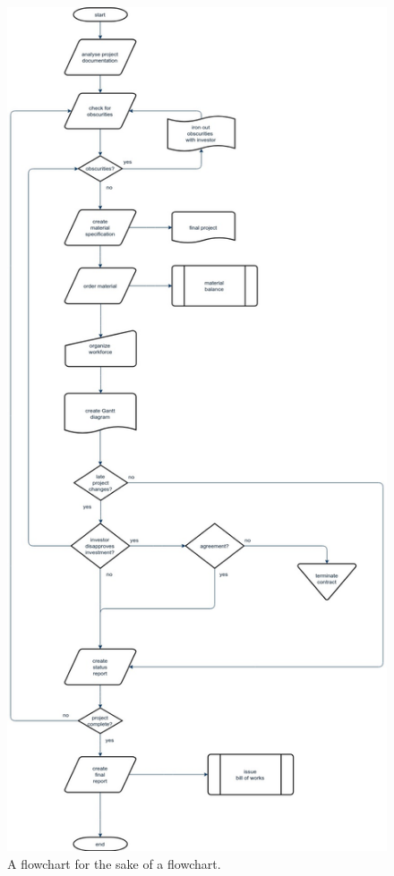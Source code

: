 \documentclass[12pt]{extarticle}
\begin{document}
\begin{figure}[!ht]
\centering
  \includegraphics[width={0.2\linewidth}]{img/flowchart.jpg}
  \caption{A flowchart for the sake of a flowchart.}
  \label{fig:flowchart}
\end{figure}
\end{document}
